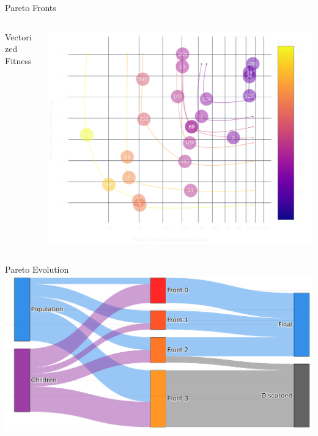 \documentclass[aspectratio=169]{beamer}
\begin{document}
\begin{frame}{{Pareto Fronts}}
  \begin{columns}[T]
      \begin{column}{.4\linewidth}
          \begin{vfilleditems}
              \item {\Large Vectorized Fitness}
              \vspace{1em}
          \end{vfilleditems}
      \end{column}
      \begin{column}{.6\linewidth}
      \includegraphics[width=0.9\linewidth, keepaspectratio]{figures/total_pareto_overview.pdf}
      \end{column}
  \end{columns}
\end{frame}


\begin{frame}{Pareto Evolution}
    \includegraphics[width=1.0\linewidth, keepaspectratio]{figures/paretoev.pdf}
\end{frame}
\end{document}
